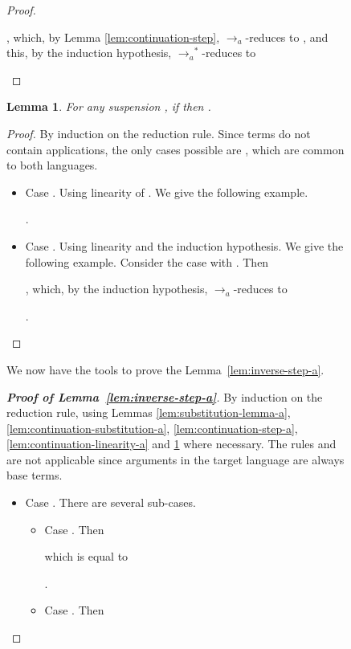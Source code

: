 \documentclass{LMCS}
\newtheorem{lemma}[theorem]{Lemma}
\newcommand{\xto}[1]{\ensuremath{\rightarrow_{#1}}}
\newcommand{\toalgred}{\xto{a}}
\newcommand{\stoalgred}{\ensuremath{\xto{a}^{\ast}}}
\begin{document}
\begin{figure}
{\begin{proof}
\begin{itemize}
      ,
      which, by Lemma \ref{lem:continuation-step}, \toalgred-reduces to
      ,
      and this, by the induction hypothesis, \stoalgred-reduces to
      
      
      \qedhere
  \end{itemize}
\end{proof}

\begin{lemma}
  \label{lem:suspension-step-a} For any suspension , if 
  then .
\end{lemma}
\begin{proof}
  By induction on the reduction rule. Since  terms do not contain
  applications, the only cases possible are , which are common
  to both languages.
  \begin{itemize}
    \item Case . Using linearity of . We give the following example.
      
      
      
      .

    \item Case . Using linearity and the induction hypothesis. We give
      the following example. Consider the case 
      with . Then 
      
      ,
      which, by the induction hypothesis, \toalgred-reduces to
      
      .
      \qedhere
  \end{itemize}
\end{proof}

We now have the tools to prove the Lemma~\ref{lem:inverse-step-a}.

\begin{proof}[\bf Proof of Lemma~\ref{lem:inverse-step-a}]
  By induction on the reduction rule, using Lemmas \ref{lem:substitution-lemma-a},
  \ref{lem:continuation-substitution-a}, \ref{lem:continuation-step-a},
  \ref{lem:continuation-linearity-a} and \ref{lem:suspension-step-a}
  where necessary. The rules  and
   are not applicable since arguments in the target language
  are always base terms.
  \begin{itemize}
    \item Case . There are several sub-cases.
      \begin{itemize}
	\item Case . Then 
	  
	  which is equal to
	  
	  
	  .

	\item Case . Then
	  

\end{itemize}
\end{itemize}
\end{proof}}
\end{figure}
\end{document}
